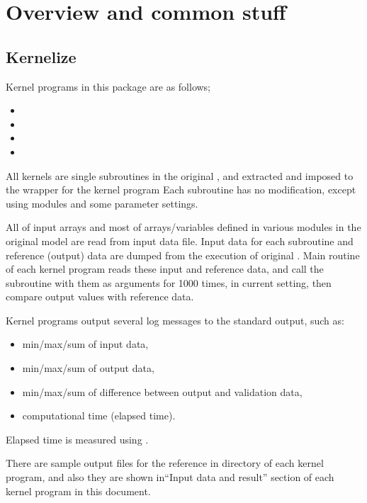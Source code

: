 \section{Overview and common stuff}

\subsection{Kernelize}\label{s:kernelize}


Kernel programs in this package are as follows;
%
\begin{itemize}
 \item {}
 \item {}
 \item {}
 \item {}
\end{itemize}
%
All kernels are single subroutines in the original\footnotemark
\DYNAMICO, and extracted and imposed to the wrapper for the kernel program
%
Each subroutine has no modification, except using modules and some
parameter settings.


All of input arrays and most of arrays/variables defined in various
modules in the original model are read from input data file.
%
Input data for each subroutine and reference (output) data are dumped
from the execution of original \DYNAMICO.
%
Main routine of each kernel program reads these input and reference
data, and call the subroutine with them as arguments for 1000 times, in
current setting, then compare output values with reference data.




Kernel programs output several log messages to the standard output, such as:
\begin{itemize}
 \item min/max/sum of input data,
 \item min/max/sum of output data,
 \item min/max/sum of difference between output and validation data,
 \item computational time (elapsed time).
\end{itemize}
%
Elapsed time is measured using .

There are sample output files for the reference in  directory
of each kernel program, and also they are shown in``Input data and
result'' section of each kernel program in this document.


